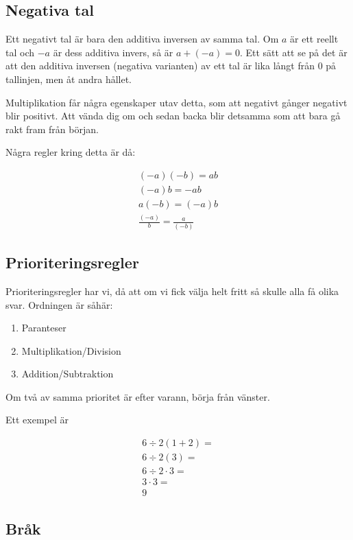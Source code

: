 \subsection{Negativa tal}

Ett negativt tal är bara den additiva inversen av samma tal. Om $a$ är ett reellt tal och $-a$ är dess additiva invers, så är $a+(-a)=0$. Ett sätt att se på det är att den additiva inversen (negativa varianten) av ett tal är lika långt från $0$ på tallinjen, men åt andra hållet. 

Multiplikation får några egenskaper utav detta, som att negativt gånger negativt blir positivt. Att vända dig om och sedan backa blir detsamma som att bara gå rakt fram från början.

Några regler kring detta är då:

\begin{align}
	(-a)(-b) = ab \\
	(-a)b = -ab \\
	a(-b) = (-a)b \\
	\frac{(-a)}{b} = \frac{a}{(-b)}
\end{align}

\newpage
\subsection{Prioriteringsregler}

Prioriteringsregler har vi, då att om vi fick välja helt fritt så skulle alla få olika svar. Ordningen är såhär:

\begin{enumerate}
	\item Paranteser
	\item Multiplikation/Division 	
	\item Addition/Subtraktion
\end{enumerate}

Om två av samma prioritet är efter varann, börja från vänster.

Ett exempel är 

\begin{align*}
	6\div 2(1+2) = \\
	6\div 2(3) = \\
	6\div 2 \cdot 3 = \\
	3 \cdot 3 = \\
	9
\end{align*}

\newpage
\subsection{Bråk}

